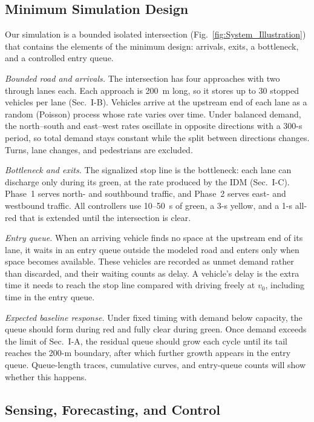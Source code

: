 \documentclass[letterpaper,12pt,conference]{ieeeconf}
\begin{document}
\subsection{Minimum Simulation Design}


Our simulation is a bounded isolated intersection
(Fig.~\ref{fig:System_Illustration}) that contains the elements
of the minimum design: arrivals, exits, a bottleneck, and a
controlled entry queue.

\emph{Bounded road and arrivals.} The intersection has four
approaches with two through lanes each. Each approach is 200~m
long, so it stores up to 30 stopped vehicles per lane
(Sec.~I-B). Vehicles arrive at the upstream end of each lane as a
random (Poisson) process whose rate varies over time. Under
balanced demand, the north--south and east--west rates oscillate
in opposite directions with a 300-s period, so total demand stays
constant while the split between directions changes. Turns, lane
changes, and pedestrians are excluded.

\emph{Bottleneck and exits.} The signalized stop line is the
bottleneck: each lane can discharge only during its green, at the
rate produced by the IDM (Sec.~I-C). Phase~1 serves north- and
southbound traffic, and Phase~2 serves east- and westbound
traffic. All controllers use 10--50~s of green, a 3-s yellow, and
a 1-s all-red that is extended until the intersection is clear.

\emph{Entry queue.} When an arriving vehicle finds no space at the
upstream end of its lane, it waits in an entry queue outside the
modeled road and enters only when space becomes available. These
vehicles are recorded as unmet demand rather than discarded, and
their waiting counts as delay. A vehicle's delay is the extra time
it needs to reach the stop line compared with driving freely at
$v_0$, including time in the entry queue.

\emph{Expected baseline response.} Under fixed timing with demand
below capacity, the queue should form during red and fully clear
during green. Once demand exceeds the limit of Sec.~I-A, the
residual queue should grow each cycle until its tail reaches the
200-m boundary, after which further growth appears in the entry
queue. Queue-length traces, cumulative curves, and entry-queue
counts will show whether this happens.


\subsection{Sensing, Forecasting, and Control}
\end{document}
